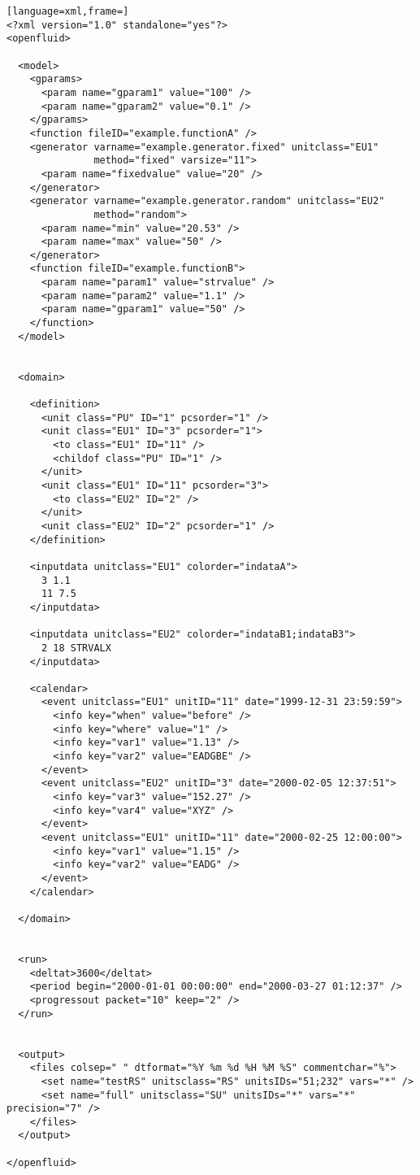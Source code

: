 \begin{lstlisting}[language=xml,frame=]
<?xml version="1.0" standalone="yes"?>
<openfluid>

  <model>
    <gparams>
      <param name="gparam1" value="100" />
      <param name="gparam2" value="0.1" />
    </gparams>
    <function fileID="example.functionA" />
    <generator varname="example.generator.fixed" unitclass="EU1"
               method="fixed" varsize="11">
      <param name="fixedvalue" value="20" />
    </generator>
    <generator varname="example.generator.random" unitclass="EU2" 
               method="random">
      <param name="min" value="20.53" />
      <param name="max" value="50" />
    </generator>
    <function fileID="example.functionB">
      <param name="param1" value="strvalue" />
      <param name="param2" value="1.1" />
      <param name="gparam1" value="50" />
    </function>
  </model>


  <domain>

    <definition>
      <unit class="PU" ID="1" pcsorder="1" />
      <unit class="EU1" ID="3" pcsorder="1">
        <to class="EU1" ID="11" />
        <childof class="PU" ID="1" />
      </unit>
      <unit class="EU1" ID="11" pcsorder="3">
        <to class="EU2" ID="2" />
      </unit>
      <unit class="EU2" ID="2" pcsorder="1" />
    </definition>

    <inputdata unitclass="EU1" colorder="indataA">
      3 1.1
      11 7.5
    </inputdata>
    
    <inputdata unitclass="EU2" colorder="indataB1;indataB3">
      2 18 STRVALX
    </inputdata>
    
    <calendar>
      <event unitclass="EU1" unitID="11" date="1999-12-31 23:59:59">
        <info key="when" value="before" />
        <info key="where" value="1" />
        <info key="var1" value="1.13" />
        <info key="var2" value="EADGBE" />
      </event>
      <event unitclass="EU2" unitID="3" date="2000-02-05 12:37:51">
        <info key="var3" value="152.27" />
        <info key="var4" value="XYZ" />
      </event>
      <event unitclass="EU1" unitID="11" date="2000-02-25 12:00:00">
        <info key="var1" value="1.15" />
        <info key="var2" value="EADG" />
      </event>
    </calendar>
    
  </domain>


  <run>
    <deltat>3600</deltat>
    <period begin="2000-01-01 00:00:00" end="2000-03-27 01:12:37" />
    <progressout packet="10" keep="2" />
  </run>


  <output>
    <files colsep=" " dtformat="%Y %m %d %H %M %S" commentchar="%">
      <set name="testRS" unitsclass="RS" unitsIDs="51;232" vars="*" />
      <set name="full" unitsclass="SU" unitsIDs="*" vars="*" precision="7" />
    </files>
  </output>

</openfluid>
\end{lstlisting}

